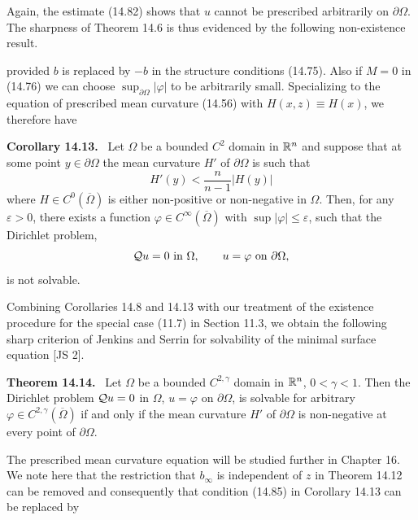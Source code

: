 Again, the estimate (14.82) shows that $u$ cannot be prescribed arbitrarily on $\partial\Omega$.
The sharpness of Theorem 14.6 is thus evidenced by the following non-existence result.



provided $b$ is replaced by $-b$ in the structure conditions (14.75). Also if $M=0$ in
(14.76) we can choose $\sup_{\partial\Omega}|\varphi|$ to be arbitrarily small. Specializing to the equation
of prescribed mean curvature (14.56) with $H(x, z)\equiv H(x)$, we therefore have

\begin{corollary}\label{gt14-boundary-gradient-14-13}
\textbf{Corollary 14.13.} \ Let $\Omega$ be a bounded $C^2$ domain in $\mathbb{R}^n$ and suppose that at some
point $y\in\partial\Omega$ the mean curvature $H'$ of $\partial\Omega$ is such that
\begin{equation}
H'(y)<\frac{n}{n-1}|H(y)|
\tag{14.85}
\end{equation}
where $H\in C^0(\overline{\Omega})$ is either non-positive or non-negative in $\Omega$. Then, for any $\varepsilon>0$,
there exists a function $\varphi\in C^\infty(\overline{\Omega})$ with $\sup|\varphi|\leq\varepsilon$, such that the Dirichlet problem,
\[
\mathcal{Q} u=0 \text{ in } \Omega,\qquad u=\varphi \text{ on } \partial\Omega,
\]
is not solvable.
\end{corollary}

Combining Corollaries 14.8 and 14.13 with our treatment of the existence
procedure for the special case (11.7) in Section 11.3, we obtain the following sharp
criterion of Jenkins and Serrin for solvability of the minimal surface equation
[JS 2].

\begin{theorem}\label{gt14-boundary-gradient-14-14}
\textbf{Theorem 14.14.} \ Let $\Omega$ be a bounded $C^{2,\gamma}$ domain in $\mathbb{R}^n$, $0<\gamma<1$. Then the Dirichlet
problem $\mathcal{Q} u=0$ in $\Omega$, $u=\varphi$ on $\partial\Omega$, is solvable for arbitrary $\varphi\in C^{2,\gamma}(\overline{\Omega})$ if and only
if the mean curvature $H'$ of $\partial\Omega$ is non-negative at every point of $\partial\Omega$.
\end{theorem}

The prescribed mean curvature equation will be studied further in Chapter 16.
We note here that the restriction that $b_\infty$ is independent of $z$ in Theorem 14.12 can
be removed and consequently that condition (14.85) in Corollary 14.13 can be
replaced by

